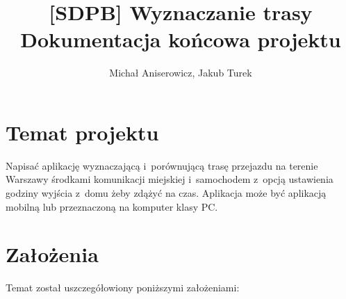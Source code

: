 \documentclass[a4paper,12pt]{article}
\title{\LARGE{[SDPB] Wyznaczanie trasy} \\ \vspace{2mm} \large{Dokumentacja końcowa projektu}}
\author{Michał Aniserowicz, Jakub Turek}
\date{}
\begin{document}
	\maketitle

	\VerbatimFootnotes

	\section*{Temat projektu}

	Napisać aplikację wyznaczającą i~porównującą trasę przejazdu na terenie Warszawy środkami komunikacji miejskiej i~samochodem z~opcją ustawienia godziny wyjścia z~domu żeby zdążyć na czas. Aplikacja może być aplikacją mobilną lub przeznaczoną na komputer klasy PC.

	\section*{Założenia}

	Temat został uszczegółowiony poniższymi założeniami:
\end{document}

